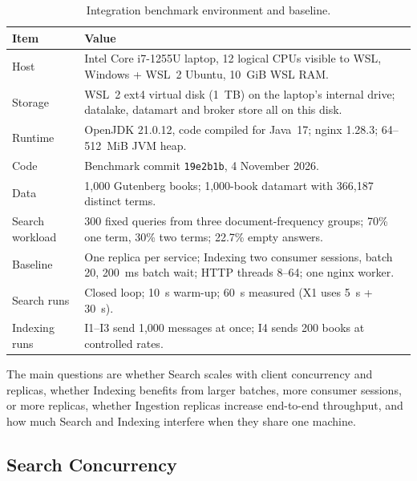 \documentclass[12pt,a4paper]{article}
\begin{document}
\begin{table}[H]
    \centering
    \caption{Integration benchmark environment and baseline.}
    \label{tab:benchmark-setup}
    \small
    \begin{tabularx}{\textwidth}{p{} X}
        \toprule
        \textbf{Item} & \textbf{Value} \\
        \midrule
        Host & Intel Core i7-1255U laptop, 12 logical CPUs visible to WSL, Windows + WSL~2 Ubuntu, 10~GiB WSL RAM. \\
        Storage & WSL~2 ext4 virtual disk (1~TB) on the laptop's internal drive; datalake, datamart and broker store all on this disk. \\
        Runtime & OpenJDK 21.0.12, code compiled for Java~17; nginx 1.28.3; 64--512~MiB JVM heap. \\
        Code & Benchmark commit \texttt{19e2b1b}, 4 November 2026. \\
        Data & 1,000 Gutenberg books; 1,000-book datamart with 366,187 distinct terms. \\
        Search workload & 300 fixed queries from three document-frequency groups; 70\% one term, 30\% two terms; 22.7\% empty answers. \\
        Baseline & One replica per service; Indexing two consumer sessions, batch 20, 200~ms batch wait; HTTP threads 8--64; one nginx worker. \\
        Search runs & Closed loop; 10~s warm-up; 60~s measured (X1 uses 5~s + 30~s). \\
        Indexing runs & I1--I3 send 1,000 messages at once; I4 sends 200 books at controlled rates. \\
        \bottomrule
    \end{tabularx}
\end{table}

The main questions are whether Search scales with client concurrency and replicas, whether Indexing
benefits from larger batches, more consumer sessions, or more replicas, whether Ingestion replicas
increase end-to-end throughput, and how much Search and Indexing interfere when they share one
machine.

\subsection{Search Concurrency}
\label{sec:s1}
\end{document}
